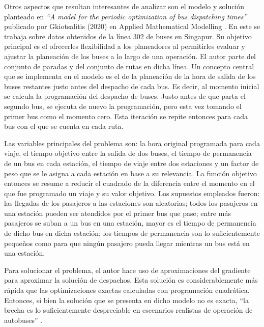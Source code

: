 \documentclass[preprint,11pt]{elsarticle}
\begin{document}
Otros aspectos que resultan interesantes de analizar son el modelo y solución planteado en  \textit{“A model for the periodic optimization of bus dispatching times”} publicado por Gkiotsalitis (2020) en Applied Mathematical Modelling \parencite{gkiotsalitis2020}. En este se trabaja sobre datos obtenidos de la línea 302 de buses en Singapur. Su objetivo principal es el ofrecerles flexibilidad a los planeadores al permitirles evaluar y ajustar la planeación de los buses a lo largo de una operación. El autor parte del conjunto de paradas y del conjunto de rutas en dicha línea. Un concepto central que se implementa en el modelo es el de la planeación de la hora de salida de los buses restantes justo antes del despacho de cada bus. Es decir, al momento inicial se calcula la programación del despacho de buses. Justo antes de que parta el segundo bus, se ejecuta de nuevo la programación, pero esta vez tomando el primer bus como el momento cero. Esta iteración se repite entonces para cada bus con el que se cuenta en cada ruta. 

Las variables principales del problema son: la hora original programada para cada viaje, el tiempo objetivo entre la salida de dos buses, el tiempo de permanencia de un bus en cada estación, el tiempo de viaje entre dos estaciones y un factor de peso que se le asigna a cada estación en base a su relevancia. La función objetivo entonces se resume a reducir el cuadrado de la diferencia entre el momento en el que fue programado un viaje y su valor objetivo. Los supuestos empleados fueron: las llegadas de los pasajeros a las estaciones son aleatorias; todos los pasajeros en una estación pueden ser atendidos por el primer bus que pase; entre más pasajeros se suban a un bus en una estación, mayor es el tiempo de permanencia de dicho bus en dicha estación; los tiempos de permanencia son lo suficientemente pequeños como para que ningún pasajero pueda llegar mientras un bus está en una estación. 

Para solucionar el problema, el autor hace uso de aproximaciones del gradiente para aproximar la solución de despachos. Esta solución es considerablemente más rápida que las optimizaciones exactas calculadas con programación cuadrática. Entonces, si bien la solución que se presenta en dicho modelo no es exacta, “la brecha es lo suficientemente despreciable en escenarios realistas de operación de autobuses” \parencite{gkiotsalitis2020}.
\end{document}
